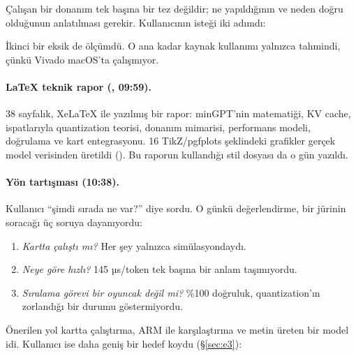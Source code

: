 
\neden
Çalışan bir donanım tek başına bir tez değildir; ne yapıldığının ve neden doğru olduğunun anlatılması gerekir. Kullanıcının isteği iki adımdı:


İkinci bir eksik de ölçümdü. O ana kadar kaynak kullanımı yalnızca tahmindi, çünkü Vivado macOS'ta çalışmıyor.

\neyapildi
\paragraph{LaTeX teknik rapor (, 09:59).} 38 sayfalık, XeLaTeX ile yazılmış bir rapor: minGPT'nin matematiği, KV cache, ispatlarıyla quantization teorisi, donanım mimarisi, performans modeli, doğrulama ve kart entegrasyonu. 16 TikZ/pgfplots şeklindeki grafikler gerçek model verisinden üretildi (). Bu raporun kullandığı stil dosyası da o gün yazıldı.

\paragraph{Yön tartışması (10:38).} Kullanıcı “şimdi sırada ne var?” diye sordu. O günkü değerlendirme, bir jürinin soracağı üç soruya dayanıyordu:
\begin{enumerate}
  \item \emph{Kartta çalıştı mı?} Her şey yalnızca simülasyondaydı.
  \item \emph{Neye göre hızlı?} 145 µs/token tek başına bir anlam taşımıyordu.
  \item \emph{Sıralama görevi bir oyuncak değil mi?} \%100 doğruluk, quantization'ın zorlandığı bir durumu göstermiyordu.
\end{enumerate}
Önerilen yol kartta çalıştırma, ARM ile karşılaştırma ve metin üreten bir model idi. Kullanıcı ise daha geniş bir hedef koydu (§\ref{sec:e3}):


